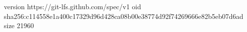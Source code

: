 version https://git-lfs.github.com/spec/v1
oid sha256:c114558e1a400c17329d96d428ca08b00e38774d92f74269666e82b5eb07d6ad
size 21960
